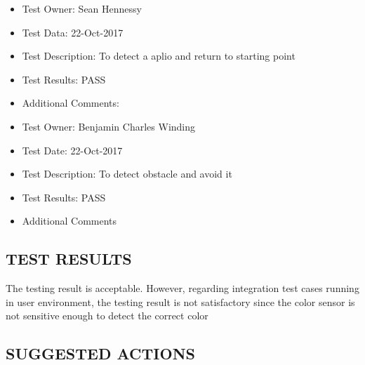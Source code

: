 \documentclass[10pt,a4paper,titlepage]{article}
\begin{document}
\begin{itemize}
	\item Test Owner: Sean Hennessy
	\item Test Data: 22-Oct-2017
	\item Test Description: To detect a aplio and return to starting point
	\item Test Results: PASS 
	\item Additional Comments: 
	
\end{itemize}


\begin{itemize}
	\item Test Owner: Benjamin Charles Winding
	\item Test Date: 22-Oct-2017
	\item Test Description: To detect obstacle and avoid it 
	\item Test Results: PASS
	\item Additional Comments	
\end{itemize}
	
\subsection{TEST RESULTS}
The testing result is acceptable. However, regarding integration test cases running in user environment, the testing result is not satisfactory since the color sensor is not sensitive enough to detect the correct color

\subsection{SUGGESTED ACTIONS}
\end{document}
